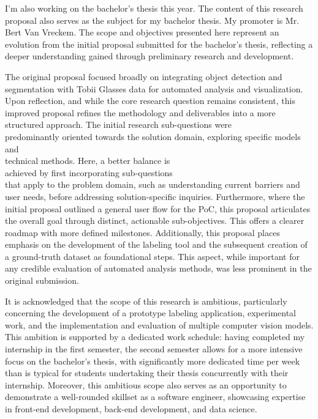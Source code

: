 \documentclass[english]{hogent-article}
\begin{document}
I'm also working on the bachelor's thesis this year. The content of this research proposal also serves as the subject for my bachelor thesis. 
My promoter is Mr. Bert Van Vreckem. The scope and objectives presented here represent an evolution from the initial proposal submitted 
for the bachelor's thesis, reflecting a deeper understanding gained through preliminary research and development.

The original proposal focused broadly on integrating object detection and segmentation with Tobii Glasses data for automated analysis and visualization.
Upon reflection, and while the core research question remains consistent, this\\ improved proposal refines the 
methodology and deliverables into a more structured approach. 
The initial research sub-questions were\\ predominantly oriented towards the solution domain, exploring specific models and\\ technical methods.
Here, a better balance is\\ achieved by first incorporating sub-questions\\ that apply to the problem domain, such as understanding current barriers and user needs, before addressing solution-specific inquiries.
Furthermore, where the initial proposal outlined a general user flow for the PoC, 
this proposal articulates the overall goal through distinct, actionable sub-objectives.
This offers a clearer roadmap with more defined milestones.
Additionally, this proposal places emphasis on the development of the labeling tool and the subsequent creation of a ground-truth dataset as foundational steps.
This aspect, while important for any credible evaluation of automated analysis methods, was less prominent in the original submission.

It is acknowledged that the scope of this research is ambitious, particularly concerning the development of a 
prototype labeling application, experimental work, and the implementation and evaluation of multiple computer vision models.
This ambition is supported by a dedicated work schedule: having completed my internship in the first semester, the second semester allows for a more intensive focus
on the bachelor's thesis, with significantly more dedicated time per week than is typical for students undertaking their thesis concurrently with their internship.
Moreover, this ambitious scope also serves as an opportunity to demonstrate a well-rounded skillset as a software engineer, showcasing expertise in front-end development, back-end development, and data science.
\end{document}
